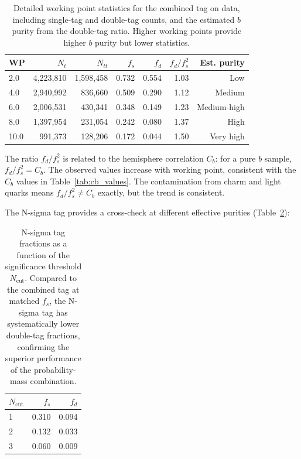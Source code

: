 \documentclass[11pt,a4paper]{article}
\begin{document}
\begin{table}[htbp]
\centering
\caption{Detailed working point statistics for the combined tag on data, including
single-tag and double-tag counts, and the estimated $b$ purity from the double-tag
ratio. Higher working points provide higher $b$ purity but lower statistics.}
\label{tab:wp_detail}
\begin{tabular}{lrrrrrr}
\toprule
WP & $N_t$ & $N_{tt}$ & $f_s$ & $f_d$ & $f_d/f_s^2$ & Est. purity \\
\midrule
2.0 & 4,223,810 & 1,598,458 & 0.732 & 0.554 & 1.03 & Low \\
4.0 & 2,940,992 & 836,660 & 0.509 & 0.290 & 1.12 & Medium \\
6.0 & 2,006,531 & 430,341 & 0.348 & 0.149 & 1.23 & Medium-high \\
8.0 & 1,397,954 & 231,054 & 0.242 & 0.080 & 1.37 & High \\
10.0 & 991,373 & 128,206 & 0.172 & 0.044 & 1.50 & Very high \\
\bottomrule
\end{tabular}
\end{table}

The ratio $f_d / f_s^2$ is related to the hemisphere correlation $C_b$: for a pure $b$
sample, $f_d / f_s^2 = C_b$. The observed values increase with working point, consistent
with the $C_b$ values in Table~\ref{tab:cb_values}. The contamination from charm and
light quarks means $f_d / f_s^2 \neq C_b$ exactly, but the trend is consistent.

The N-sigma tag provides a cross-check at different effective purities
(Table~\ref{tab:nsigma_fractions}):

\begin{table}[htbp]
\centering
\caption{N-sigma tag fractions as a function of the significance threshold $N_\mathrm{cut}$.
Compared to the combined tag at matched $f_s$, the N-sigma tag has systematically lower
double-tag fractions, confirming the superior performance of the probability-mass combination.}
\label{tab:nsigma_fractions}
\begin{tabular}{lrr}
\toprule
$N_\mathrm{cut}$ & $f_s$ & $f_d$ \\
\midrule
1 & 0.310 & 0.094 \\
2 & 0.132 & 0.033 \\
3 & 0.060 & 0.009 \\
\bottomrule
\end{tabular}
\end{table}
\end{document}
